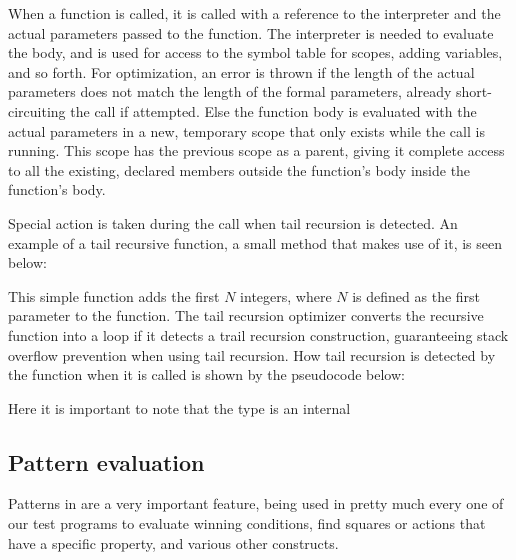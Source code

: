 When a function is called, it is called with a reference to the
interpreter and the actual parameters passed to the function. The
interpreter is needed to evaluate the body, and is used for access
to the symbol table for scopes, adding variables, and so forth.
For optimization, an error is thrown if the length of the actual
parameters does not match the length of the formal parameters, already
short-circuiting the call if attempted. Else the function body is
evaluated with the actual parameters in a new, temporary scope that only
exists while the call is running. This scope has the previous scope as a
parent, giving it complete access to all the existing, declared members
outside the function's body inside the function's body.

Special action is taken during the call when tail recursion is
detected. An example of a tail recursive function, a small method
 that makes use of it, is seen below:


This simple function adds the first $N$ integers, where $N$ is defined as the first parameter to the function. The tail recursion optimizer converts the recursive function into a loop if it detects a trail recursion construction, guaranteeing stack overflow prevention when using tail recursion. How tail recursion is detected by the function when it is called is shown by the pseudocode below:



Here it is important to note that the type  is an internal 

\subsection{Pattern evaluation}
Patterns in \productname{} are a very important feature, being used
in pretty much every one of our test programs to evaluate winning
conditions, find squares or actions that have a specific property, and
various other constructs.

